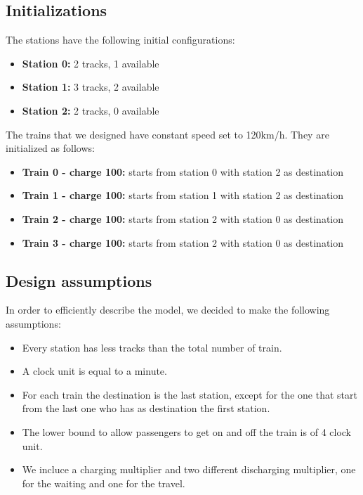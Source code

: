 \subsection{Initializations}
The stations have the following initial configurations:
\begin{itemize}
    \item \textbf{Station 0: } 2 tracks, 1 available
    \item \textbf{Station 1: } 3 tracks, 2 available
    \item \textbf{Station 2: } 2 tracks, 0 available
\end{itemize}
\newpage

The trains that we designed have constant speed set to 120km/h. They are initialized as follows:
\begin{itemize}
    \item \textbf{Train 0 - charge 100: } starts from station 0 with station 2 as destination
    \item \textbf{Train 1 - charge 100: } starts from station 1 with station 2 as destination
    \item \textbf{Train 2 - charge 100: } starts from station 2 with station 0 as destination
    \item \textbf{Train 3 - charge 100: } starts from station 2 with station 0 as destination
\end{itemize}
\bigskip

\subsection{Design assumptions}
In order to efficiently describe the model, we decided to make the following assumptions:
\begin{itemize}
    \item Every station has less tracks than the total number of train.
    \item A clock unit is equal to a minute.
    \item For each train the destination is the last station, except for the one that start from the last one who has
    as destination the first station.
    \item The lower bound to allow passengers to get on and off the train is of 4 clock unit.
    \item We incluce a charging multiplier and two different discharging multiplier, one for the waiting and one for the travel.
\end{itemize}


